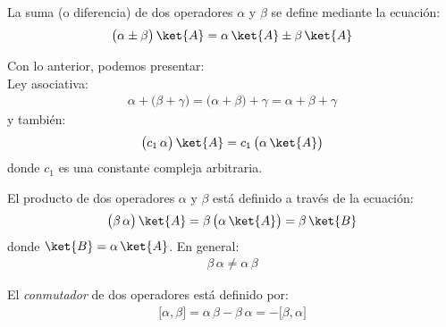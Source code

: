 La suma (o diferencia) de dos operadores $\alpha$ y $\beta$ se define mediante la ecuación:
\begin{align}
\big( \alpha \pm \beta \big) \, \ket{A} = \alpha \, \ket{A} \pm \beta \, \ket{A}
\label{eq:ecuacion_15}
\end{align}

Con lo anterior, podemos presentar:
\\
Ley asociativa:
\begin{align}
\alpha + \big( \beta + \gamma \big) = \big( \alpha + \beta \big) + \gamma = \alpha + \beta + \gamma
\label{eq:ecuacion_16}
\end{align}
y también:
\begin{align}
\big( c_{1} \, \alpha \big) \, \ket{A} = c_{1} \, \big( \alpha \, \ket{A} \big)
\label{eq:ecuacion_17}
\end{align}
donde $c_{1}$ es una constante compleja arbitraria.
\par
El producto de dos operadores $\alpha$ y $\beta$ está
definido a través de la ecuación:
\begin{align}
\big( \beta \, \alpha \big) \, \ket{A} = \beta \, \big( \alpha \, \ket{A} \big) = \beta \, \ket{B}
\label{eq:ecuacion_18}
\end{align}
donde $\ket{B} = \alpha \, \ket{A}$. En general:
\begin{align}
\beta \, \alpha \neq \alpha \, \beta
\label{eq:ecuacion_19}
\end{align}

El \emph{conmutador} de dos operadores está definido por: 
\begin{align}
\big[ \alpha, \beta \big] = \alpha \, \beta - \beta \, \alpha = - \big[ \beta, \alpha \big]
\label{eq:ecuacion_20}
\end{align}

